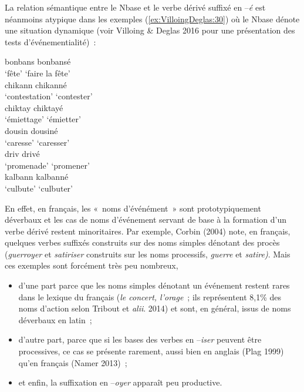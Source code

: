 \documentclass[output=paper]{langsci/langscibook}
\begin{document}
La relation sémantique entre le Nbase et le verbe dérivé suffixé en
--\emph{é} est néanmoins atypique dans les exemples (\ref{ex:VilloingDeglas:30}) où le Nbase
dénote une situation dynamique (voir Villoing \& Deglas 2016 pour une
présentation des tests d'événementialité)~:

\ea \label{ex:VilloingDeglas:30}
  \ea \gll bonbans \textrightarrow{} bonbansé\\
  {`fête'} {} {`faire la fête'}\\
  \ex \gll chikann \textrightarrow{} chikanné\\
  {`contestation'} {} {`contester'}\\
  \ex \gll chiktay \textrightarrow{} chiktayé\\
  {`émiettage'} {} {`émietter'}\\
  \ex \gll dousin \textrightarrow{} dousiné\\
  {`caresse'} {} {`caresser'}\\
  \ex \gll driv \textrightarrow{} drivé\\
  {`promenade'} {} {`promener'}\\
  \ex \gll kalbann \textrightarrow{} kalbanné\\
  {`culbute'} {} {`culbuter'}\\
\z\z

En effet, en français, les «~noms d'événément~» sont prototypiquement
déverbaux et les cas de noms d'événement servant de base à la formation
d'un verbe dérivé restent minoritaires. Par exemple, Corbin (2004) note,
en français, quelques verbes suffixés construits sur des noms simples
dénotant des procès (\emph{guerroyer} et \emph{satiriser} construits sur
les noms processifs, \emph{guerre} et \emph{satire)}. Mais ces exemples
sont forcément très peu nombreux,

\begin{itemize}
\item d'une part parce que les noms simples dénotant un événement restent
rares dans le lexique du français (\emph{le concert, l'orage}~; ils
représentent 8,1\% des noms d'action selon Tribout et \emph{alii}. 2014)
et sont, en général, issus de noms déverbaux en latin~;

\item d'autre part, parce que si les bases des verbes en --\emph{iser}
peuvent être processives, ce cas se présente rarement, aussi bien en
anglais (Plag 1999) qu'en français (Namer 2013)~;

\item et enfin, la suffixation en --\emph{oyer} apparaît peu productive.
\end{itemize}
\end{document}
